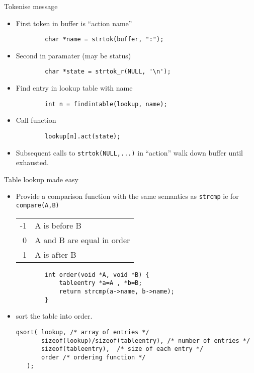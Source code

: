 \documentclass[xcolor=svgnames]{beamer}
\begin{document}
\begin{frame}[fragile]{Tokenise message}
\begin{itemize}
    \item First token in buffer is ``action name''
    \begin{verbatim}
        char *name = strtok(buffer, ":");
    \end{verbatim}
    \item Second in paramater (may be status)
    \begin{verbatim}
        char *state = strtok_r(NULL, '\n');
    \end{verbatim}
    \item Find entry in lookup table with name
    \begin{verbatim}
        int n = findintable(lookup, name);
    \end{verbatim}
    \item Call function
    \begin{verbatim}
        lookup[n].act(state);
    \end{verbatim}
    \item Subsequent calls to \texttt{strtok(NULL,...)} in ``action'' walk down buffer  until exhausted.
\end{itemize}

\end{frame}

\begin{frame}[fragile]{Table lookup made easy}
\begin{itemize}
    \item Provide a comparison function with the same semantics as \texttt{strcmp} ie for \texttt{compare(A,B)}
    \begin{tabular}{rl}
        -1 & A is before B \\
        0 & A and B are equal in order \\
        1 & A is after B
    \end{tabular}
    \begin{verbatim}
        int order(void *A, void *B) {
            tableentry *a=A , *b=B;
            return strcmp(a->name, b->name);
        }
    \end{verbatim}
    \item sort the table into order.
    \begin{verbatim}
qsort( lookup, /* array of entries */
       sizeof(lookup)/sizeof(tableentry), /* number of entries */
       sizeof(tableentry),  /* size of each entry */
       order /* ordering function */
   );
    \end{verbatim}
\end{itemize}
\end{frame}
\end{document}
